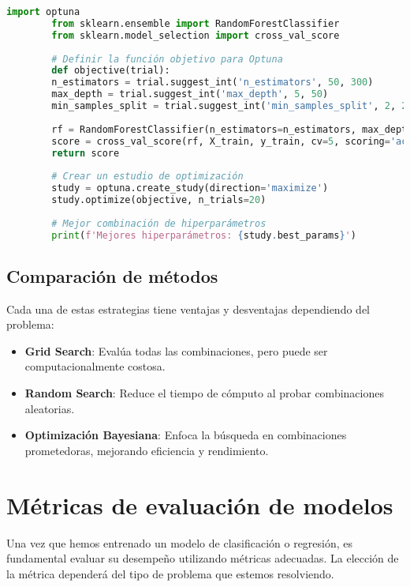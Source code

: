 \documentclass{book}
\begin{document}
	\begin{lstlisting}[language=Python, caption=Optimización de hiperparámetros con Optuna]
		import optuna
		from sklearn.ensemble import RandomForestClassifier
		from sklearn.model_selection import cross_val_score
		
		# Definir la función objetivo para Optuna
		def objective(trial):
		n_estimators = trial.suggest_int('n_estimators', 50, 300)
		max_depth = trial.suggest_int('max_depth', 5, 50)
		min_samples_split = trial.suggest_int('min_samples_split', 2, 20)
		
		rf = RandomForestClassifier(n_estimators=n_estimators, max_depth=max_depth, min_samples_split=min_samples_split, random_state=42)
		score = cross_val_score(rf, X_train, y_train, cv=5, scoring='accuracy').mean()
		return score
		
		# Crear un estudio de optimización
		study = optuna.create_study(direction='maximize')
		study.optimize(objective, n_trials=20)
		
		# Mejor combinación de hiperparámetros
		print(f'Mejores hiperparámetros: {study.best_params}')
	\end{lstlisting}
	
	\subsection{Comparación de métodos}
	
	Cada una de estas estrategias tiene ventajas y desventajas dependiendo del problema:
	
	\begin{itemize}
		\item \textbf{Grid Search}: Evalúa todas las combinaciones, pero puede ser computacionalmente costosa.
		\item \textbf{Random Search}: Reduce el tiempo de cómputo al probar combinaciones aleatorias.
		\item \textbf{Optimización Bayesiana}: Enfoca la búsqueda en combinaciones prometedoras, mejorando eficiencia y rendimiento.
	\end{itemize}
	
	\section{Métricas de evaluación de modelos}
	
	Una vez que hemos entrenado un modelo de clasificación o regresión, es fundamental evaluar su desempeño utilizando métricas adecuadas. La elección de la métrica dependerá del tipo de problema que estemos resolviendo\parencite{ramos-2011}.
	
\end{document}
